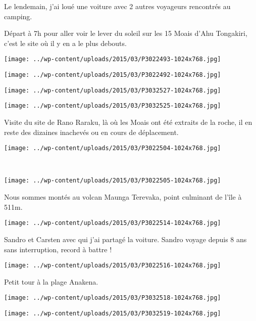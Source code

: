  Le lendemain, j'ai loué une voiture avec 2 autres voyageurs rencontrés au camping.

 Départ à 7h pour aller voir le lever du soleil sur les 15 Moais d'Ahu Tongakiri, c'est le site où il y en a le plus debouts.
\begin{center} \texttt{[image: ../wp-content/uploads/2015/03/P3022493-1024x768.jpg]} \end{center}
\begin{center} \texttt{[image: ../wp-content/uploads/2015/03/P3022492-1024x768.jpg]} \end{center}
\begin{center} \texttt{[image: ../wp-content/uploads/2015/03/P3032527-1024x768.jpg]} \end{center}
\begin{center} \texttt{[image: ../wp-content/uploads/2015/03/P3032525-1024x768.jpg]} \end{center}

Visite du site de Rano Raraku, là où les Moais ont été extraits de la roche, il en reste des dizaines inachevés ou en cours de déplacement.
\begin{center} \texttt{[image: ../wp-content/uploads/2015/03/P3022504-1024x768.jpg]} \end{center}
\vspace{-\topsep}
\pagebreak
~\\
\begin{center} \texttt{[image: ../wp-content/uploads/2015/03/P3022505-1024x768.jpg]} \end{center}

 Nous sommes montés au volcan Maunga Terevaka, point culminant de l'île à 511m.
\begin{center} \texttt{[image: ../wp-content/uploads/2015/03/P3022514-1024x768.jpg]} \end{center}
\vspace{-\topsep}

\pagebreak
 Sandro et Carsten avec qui j'ai partagé la voiture. Sandro voyage depuis 8 ans sans interruption, record à battre !
\begin{center} \texttt{[image: ../wp-content/uploads/2015/03/P3022516-1024x768.jpg]} \end{center}

Petit tour à la plage Anakena.\\
\begin{center} \texttt{[image: ../wp-content/uploads/2015/03/P3032518-1024x768.jpg]} \end{center}
\begin{center} \texttt{[image: ../wp-content/uploads/2015/03/P3032519-1024x768.jpg]} \end{center}


